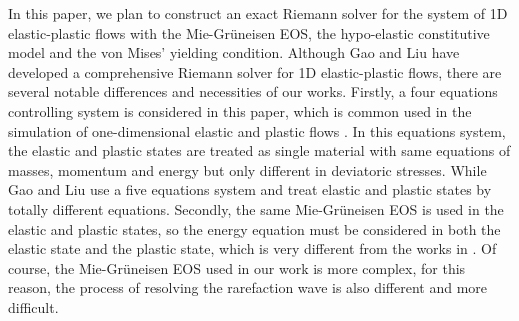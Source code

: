 \documentclass{article}
\numberwithin{equation}{section}
\numberwithin{table}{section}
\begin{document}
{\color{blue}
In this paper, we  plan to construct an exact Riemann solver for the system of 1D elastic-plastic flows with the Mie-Gr\"uneisen EOS, the hypo-elastic constitutive model and the von Mises' yielding condition. Although Gao and Liu \cite{gao20171d,gao2018complete} have developed a comprehensive Riemann solver for 1D elastic-plastic flows, there are several notable differences and necessities of our works.
Firstly,  a four equations controlling system is considered in this paper, which is common used in the simulation of one-dimensional elastic and plastic flows \cite{ortega2014numerical,favrie2011dynamics}. In this equations system, the elastic and plastic states are treated as single material with same equations of masses, momentum and energy but only different in deviatoric stresses. While Gao and Liu \cite{gao20171d,gao2018complete} use a five equations system and treat elastic and plastic states by totally different equations.  Secondly, the same Mie-Gr\"uneisen EOS is used in the elastic and plastic states, so the energy equation must be considered in both the elastic state and the plastic state, which is  very different from the works in \cite{gao20171d,gao2018complete}. Of course, the Mie-Gr\"uneisen EOS used in our work is more complex, for this reason, the process of resolving the rarefaction wave is also different and more difficult.}
 
 
\end{document}

